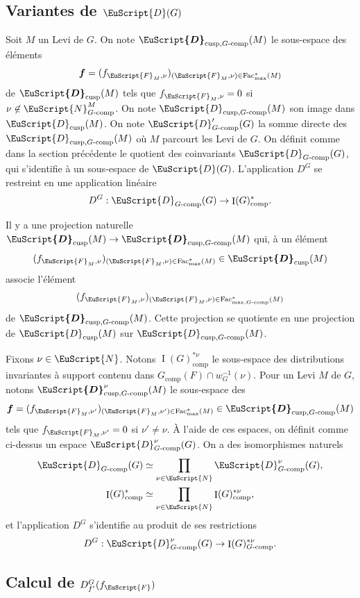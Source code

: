 \documentclass[JEP,XML,SOM,Unicode,francais]{cedram}
\let\mathcal \EuScript
\newcommand{\comp}{\mathrm{comp}}
\newcommand{\tcomp}{\textup{-comp}}
\newcommand{\cusp}{\mathrm{cusp}}
\newcommand{\Fac}{\mathrm{Fac}}
\DeclareMathOperator{\rI}{I}
\newcommand{\bmf}{\boldsymbol{f}}
\newcommand{\cD}{\mathcal{D}}
\newcommand{\cF}{\mathcal{F}}
\newcommand{\cN}{\mathcal{N}}
\theoremstyle{plain}
\theoremstyle{definition}
\begin{document}
\subsection{Variantes de \texorpdfstring{$\cD(G)$}{DG}}\label{variantes}
Soit $M$ un Levi de $G$. On note $\boldsymbol{\cD}_{\cusp,G\tcomp}(M)$ le sous-espace des éléments
\[
\bmf=(f_{\cF_{M},\nu})_{(\cF_{M},\nu)\in \Fac^*_{\max}(M)}
\]
de $ \boldsymbol{\cD}_{\cusp}(M)$ tels que $f_{\cF_{M},\nu}=0$ si $\nu\not\in \cN^M_{G\tcomp}$. On note $\cD_{\cusp,G\tcomp}(M)$ son image dans $\cD_{\cusp}(M)$. On note $\cD'_{G\tcomp}(G)$ la somme directe des $\cD_{\cusp,G\tcomp}(M)$ où $M$ parcourt les Levi de $G$. On définit comme dans la section précédente le quotient des coinvariants $\cD_{G\tcomp}(G)$, qui s'identifie à un sous-espace de $\cD(G)$. L'application $D^G$ se restreint en une application linéaire
\[
D^G:\cD_{G\tcomp}(G)\to \rI(G)^*_{\comp}.
\]

Il y a une projection naturelle $\boldsymbol{\cD}_{\cusp}(M)\to \boldsymbol{\cD}_{\cusp,G\tcomp}(M)$ qui, à un élément
\[
(f_{\cF_{M},\nu})_{(\cF_{M},\nu)\in \Fac^*_{\max}(M)}\in \boldsymbol{\cD}_{\cusp}(M)
\]
associe l'élément
\[
(f_{\cF_{M},\nu})_{(\cF_{M},\nu)\in \Fac^*_{\max,G\tcomp}(M)}
\]
de $ \boldsymbol{\cD}_{\cusp,G\tcomp}(M)$. Cette projection se quotiente en une projection de $\cD_{\cusp}(M)$ sur $\cD_{\cusp,G\tcomp}(M)$.

Fixons $\nu\in \cN$. Notons $\rI(G)^{*\nu}_{\comp}$ le sous-espace des distributions invariantes à support contenu dans $G_{\comp}(F)\cap w_{G}^{-1}(\nu)$. Pour un Levi $M$ de $G$, notons $\boldsymbol{\cD}^{\nu}_{\cusp,G\tcomp}(M)$ le sous-espace des
\[
\bmf=(f_{\cF_{M},\nu'})_{(\cF_{M},\nu')\in \Fac^*_{\max}(M)}\in \boldsymbol{\cD}_{\cusp,G\tcomp}(M)
\]
tels que $f_{\cF_{M},\nu'}=0$ si $\nu'\neq\nu$. À l'aide de ces espaces, on définit comme ci-dessus un espace $\cD^{\nu}_{G\tcomp}(G)$. On a des isomorphismes naturels
\begin{align*}
\cD_{G\tcomp}(G)&\simeq \prod_{\nu\in \cN}\cD_{G\tcomp}^{\nu}(G),
\\
\rI(G)^*_{\comp}&\simeq \prod_{\nu\in \cN}\rI(G)^{*\nu}_{\comp},
\end{align*}
et l'application $D^G$ s'identifie au produit de ses restrictions
\[
D^G:\cD_{G\tcomp}^{\nu}(G)\to \rI(G)^{*\nu}_{G\tcomp}.
\]

\subsection{Calcul de \texorpdfstring{$D_{f'}^G(f_{\cF})$}{DGf}}\label{calcul}
\end{document}
